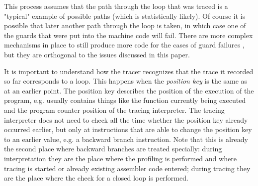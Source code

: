 \documentclass{acm_proc_article-sp}
\let\oldcite=\cite
\renewcommand\cite[1]{\ifthenelse{\equal{#1}{XXX}}{[citation~needed]}{\oldcite{#1}}}
\begin{document}
This process assumes that the path through the loop that was traced is a
"typical" example of possible paths (which is statistically likely). Of course
it is possible that later another path through the loop is taken, in which case
one of the guards that were put into the machine code will fail. There are more
complex mechanisms in place to still produce more code for the cases of guard
failures \cite{XXX}, but they are orthogonal to the issues discussed in this
paper.

It is important to understand how the tracer recognizes that the trace it
recorded so far corresponds to a loop.
This happens when the \emph{position key} is the same as at an earlier
point. The position key describes the position of the execution of the program,
e.g. usually contains things like the function currently being executed and the
program counter position of the tracing interpreter. The tracing interpreter
does not need to check all the time whether the position key already occurred
earlier, but only at instructions that are able to change the position key
to an earlier value, e.g. a backward branch instruction. Note that this is
already the second place where backward branches are treated specially: during
interpretation they are the place where the profiling is performed and where
tracing is started or already existing assembler code entered; during tracing
they are the place where the check for a closed loop is performed.
\end{document}
